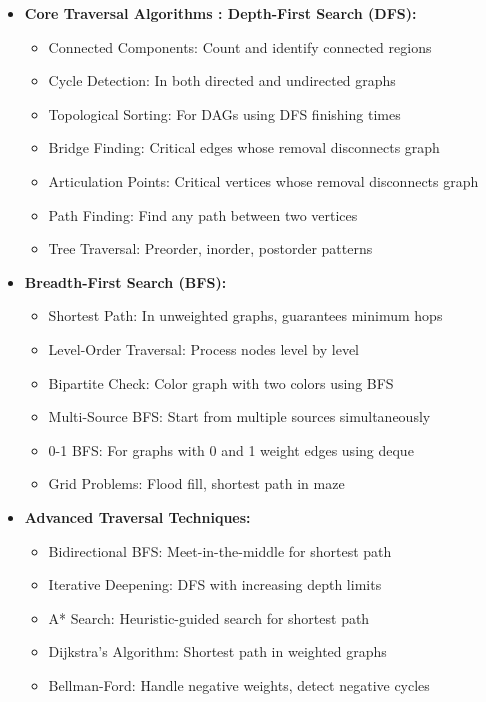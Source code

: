 \documentclass[a4paper,10pt]{book}
\begin{document}
\begin{itemize}[leftmargin=*]
    \item \textbf{Core Traversal Algorithms : Depth-First Search (DFS):}
    \begin{itemize}
        \item Connected Components: Count and identify connected regions
        \item Cycle Detection: In both directed and undirected graphs
        \item Topological Sorting: For DAGs using DFS finishing times
        \item Bridge Finding: Critical edges whose removal disconnects graph
        \item Articulation Points: Critical vertices whose removal disconnects graph
        \item Path Finding: Find any path between two vertices
        \item Tree Traversal: Preorder, inorder, postorder patterns
    \end{itemize}

    \item \textbf{Breadth-First Search (BFS):}
    \begin{itemize}
        \item Shortest Path: In unweighted graphs, guarantees minimum hops
        \item Level-Order Traversal: Process nodes level by level
        \item Bipartite Check: Color graph with two colors using BFS
        \item Multi-Source BFS: Start from multiple sources simultaneously
        \item 0-1 BFS: For graphs with 0 and 1 weight edges using deque
        \item Grid Problems: Flood fill, shortest path in maze
    \end{itemize}

    \item \textbf{Advanced Traversal Techniques:}
    \begin{itemize}
        \item Bidirectional BFS: Meet-in-the-middle for shortest path
        \item Iterative Deepening: DFS with increasing depth limits
        \item A* Search: Heuristic-guided search for shortest path
        \item Dijkstra's Algorithm: Shortest path in weighted graphs
        \item Bellman-Ford: Handle negative weights, detect negative cycles
    \end{itemize}
\end{itemize}
\end{document}
